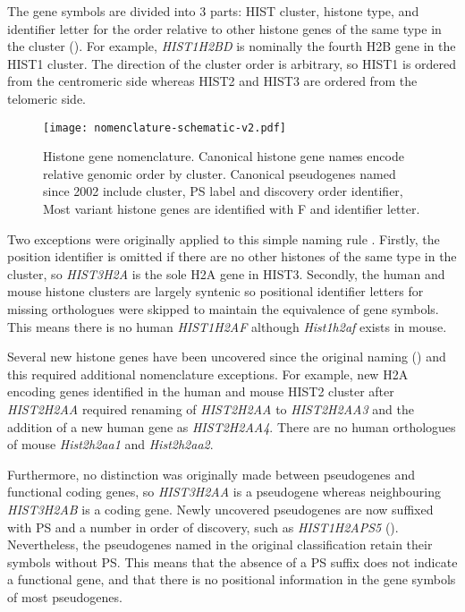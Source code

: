 	The gene symbols are divided into 3 parts: 
	HIST cluster, histone type, and identifier letter
	for the order relative to other histone genes of the same type in the cluster ().
	For example, \textit{HIST1H2BD} is nominally the fourth H2B gene in the HIST1 cluster.
	The direction of the cluster order is arbitrary, 
	so HIST1 is ordered from the centromeric side 
	whereas HIST2 and HIST3 are ordered from the telomeric side.

\begin{figure*}[hp]
	\centering
	\texttt{[image: nomenclature-schematic-v2.pdf]}
	\caption{Histone gene nomenclature. 
	Canonical histone gene names encode relative genomic order by cluster.
	Canonical pseudogenes named since 2002 include cluster, PS label and discovery order identifier,
	Most variant histone genes are identified with F and identifier letter.}
	\label{fig:nomenclature}
\end{figure*}

	Two exceptions were originally applied to this simple naming rule \citep{Marzluff02}. 
	Firstly, the position identifier is omitted if there are no other histones of the same type in the cluster, 
	so \textit{HIST3H2A} is the sole H2A gene in HIST3. 
	Secondly, the human and mouse histone clusters are largely syntenic 
	so positional identifier letters for missing orthologues were skipped to maintain the equivalence of gene symbols.
	This means there is no human \textit{HIST1H2AF} although \textit{Hist1h2af} exists in mouse.

	Several new histone genes have been uncovered since the original naming () 
	and this required additional nomenclature exceptions.
	For example, new H2A encoding genes identified in the human and mouse HIST2 cluster after \textit{HIST2H2AA} 
	required renaming of \textit{HIST2H2AA} to \textit{HIST2H2AA3} 
	and the addition of a new human gene as \textit{HIST2H2AA4}. 
	There are no human orthologues of mouse \textit{Hist2h2aa1} and \textit{Hist2h2aa2}.

	Furthermore, no distinction was originally made between pseudogenes and functional coding genes,
	so \textit{HIST3H2AA} is a pseudogene whereas neighbouring \textit{HIST3H2AB} is a coding gene.
	Newly uncovered pseudogenes are now suffixed with PS and a number in order of discovery,
	such as \textit{HIST1H2APS5} (). 
	Nevertheless, the pseudogenes named in the original classification retain their symbols without PS.
	This means that the absence of a PS suffix does not indicate a functional gene, 
	and that there is no positional information in the gene symbols of most pseudogenes.

